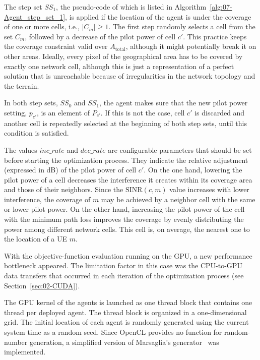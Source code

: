The step set $SS_{1}$, the pseudo-code of which is listed in Algorithm~\ref{alg:07-Agent_step_set_1},
is applied if the location of the agent is under the coverage of one
or more cells, i.e., $\vert C_{m}\vert\ge1$. The first step randomly
selects a cell from the set $C_{m}$, followed by a decrease of the
pilot power of cell $c'$. This practice keeps the coverage constraint
valid over $A_{\mathrm{total}}$, although it might potentially break
it on other areas. Ideally, every pixel of the geographical area has
to be covered by exactly one network cell, although this is just a
representation of a perfect solution that is unreachable because of
irregularities in the network topology and the terrain.

In both step sets, $SS_{0}$ and $SS_{1}$, the agent makes sure that
the new pilot power setting, $p_{c'}$, is an element of $P_{c'}$.
If this is not the case, cell $c'$ is discarded and another cell
is repeatedly selected at the beginning of both step sets, until this
condition is satisfied.

The values $inc\_rate$ and $dec\_rate$ are configurable parameters
that should be set before starting the optimization process. They
indicate the relative adjustment (expressed in dB) of the pilot power
of cell $c'$. On the one hand, lowering the pilot power of a cell
decreases the interference it creates within its coverage area and
those of their neighbors. Since the $\mathrm{SINR}(c,m)$ value increases
with lower interference, the coverage of $m$ may be achieved by a
neighbor cell with the same or lower pilot power. On the other hand,
increasing the pilot power of the cell with the minimum path loss
improves the coverage by evenly distributing the power among different
network cells. This cell is, on average, the nearest one to the location
of a UE $m$.

\bigskip{}


With the objective-function evaluation running on the GPU, a new performance
bottleneck appeared. The limitation factor in this case was the CPU-to-GPU
data transfers that occurred in each iteration of the optimization
process (see Section~\ref{sec:02-CUDA}).

The GPU kernel of the agents is launched as one thread block that
contains one thread per deployed agent. The thread block is organized
in a one-dimensional grid. The initial location of each agent is randomly
generated using the current system time as a random seed. Since OpenCL
provides no function for random-number generation, a simplified version
of Marsaglia's generator~\cite{Marsaglia_Seeds.for.random.number.generator:2003}
was implemented.

